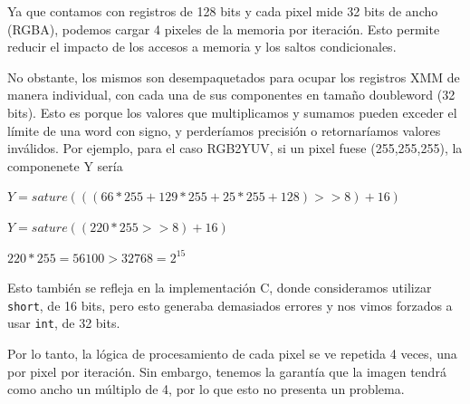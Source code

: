 \begin{center}
	 

	 

	 
\end{center}

Ya que contamos con registros de 128 bits y cada pixel mide 32 bits de ancho (RGBA), podemos cargar 4 pixeles de la memoria por iteración. Esto permite reducir el impacto de los accesos a memoria y los saltos condicionales.

No obstante, los mismos son desempaquetados para ocupar los registros XMM de manera individual, con cada una de sus componentes en tamaño doubleword (32 bits). Esto es porque los valores que multiplicamos y sumamos pueden exceder el límite de una word con signo, y perderíamos precisión o retornaríamos valores inválidos. Por ejemplo, para el caso RGB2YUV, si un pixel fuese (255,255,255), la componenete Y sería

\begin{center}

	$Y = sature(((66 * 255 + 129 * 255 + 25 * 255 + 128) >> 8) + 16)$

	$Y = sature((220*255 >> 8) + 16)$

	$220 * 255 = 56100 > 32768 = 2^{15}$
\end{center}

Esto también se refleja en la implementación C, donde consideramos utilizar \texttt{short}, de 16 bits, pero esto generaba demasiados errores y nos vimos forzados a usar \texttt{int}, de 32 bits.

Por lo tanto, la lógica de procesamiento de cada pixel se ve repetida 4 veces, una por pixel por iteración. Sin embargo, tenemos la garantía que la imagen tendrá como ancho un múltiplo de 4, por lo que esto no presenta un problema.

